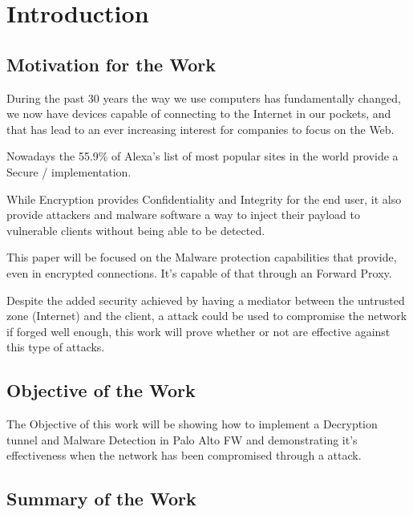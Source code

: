 \newpage

\printunsrtglossary[type=abbreviations,title=Acronyms]

\newpage



\chapter{Introduction}
\section{Motivation for the Work}

During the past 30 years the way we use computers has fundamentally changed, we now have devices capable of connecting to the Internet in our pockets, and that has lead to an ever increasing interest for companies to focus on the Web.

Nowadays the 55.9\% of Alexa's list of most popular sites in the world provide a Secure / implementation\cite{ssl-pulse}.

While Encryption provides Confidentiality and Integrity\cite{ibm-ssl} for the end user, it also provide attackers and malware software a way to inject their payload to vulnerable clients without being able to be detected.

This paper will be focused on the Malware protection capabilities that  provide, even in encrypted connections. It's capable of that through an  Forward Proxy.

Despite the added security achieved by having a mediator between the untrusted zone (Internet) and the client, a  attack could be used to compromise the network if forged well enough, this work will prove whether or not  are effective against this type of attacks.


\section{Objective of the Work}

The Objective of this work will be showing how to implement a Decryption tunnel and Malware Detection in Palo Alto FW and demonstrating it's effectiveness when the network has been compromised through a  attack.


\section{Summary of the Work}

